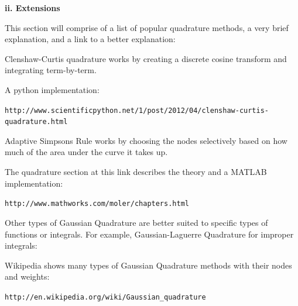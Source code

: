 \documentclass[12pt]{article}
\newcommand{\newLine}{\vspace{5mm}}
\newcommand{\nextsubsection}[1]{\newLine \noindent \large \textbf{#1} \normalsize}
\begin{document}
\nextsubsection{ii. Extensions}

\newLine This section will comprise of a list of popular quadrature methods, a very brief explanation, and a link to a better explanation:

\newLine Clenshaw-Curtis quadrature works by creating a discrete cosine transform and integrating term-by-term. 

\newLine\noindent A python implementation: 

\texttt{\small http://www.scientificpython.net/1/post/2012/04/clenshaw-curtis-quadrature.html \normalsize}

\newLine \newLine Adaptive Simpsons Rule works by choosing the nodes selectively based on how much of the area under the curve it takes up.

\newLine\noindent The quadrature section at this link describes the theory and a MATLAB implementation:

\texttt{\small http://www.mathworks.com/moler/chapters.html \normalsize}

\newLine\newLine Other types of Gaussian Quadrature are better suited to specific types of functions or integrals. For example, Gaussian-Laguerre Quadrature for improper integrals:

\newLine \noindent Wikipedia shows many types of Gaussian Quadrature methods with their nodes and weights:

\texttt{\small http://en.wikipedia.org/wiki/Gaussian\_quadrature \normalsize}
\end{document}
